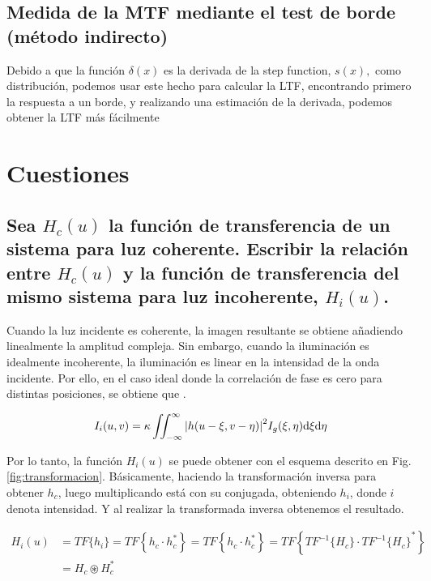 \documentclass{./packages/optica-article}
\newcommand\conv{\circledast}
\begin{document}
\subsection{Medida de la MTF mediante el test de borde (método indirecto)}

Debido a que la función $\delta(x)$ es la derivada de la step function, $s(x),$ como distribución, podemos usar este hecho para calcular la LTF, encontrando primero la respuesta a un borde, y realizando una estimación de la derivada, podemos obtener la LTF más fácilmente

\section{Cuestiones}

\subsection{Sea $H_{c}(u)$ la función de transferencia de un sistema para luz coherente. Escribir la relación entre $H_{c}(u)$ y la función de transferencia del mismo sistema para luz incoherente, $H_{i}(u)$.}

Cuando la luz incidente es coherente, la imagen resultante se obtiene añadiendo linealmente la amplitud compleja. Sin embargo, cuando la iluminación es idealmente incoherente, la iluminación es linear en la intensidad de la onda incidente. Por ello, en el caso ideal donde la correlación de fase es cero para distintas posiciones, se obtiene que \cite[p.~132--134]{goodman1996introduction}.

\begin{equation}
	I_{i}(u,v) = \kappa \iint_{-\infty}^{\infty}\abs{h(u - \xi, v- \eta)}^{2} I_{g}(\xi, \eta) \dd \xi \dd \eta
\end{equation}

Por lo tanto, la función $H_{i}(u)$ se puede obtener con el esquema descrito en Fig. \ref{fig:transformacion}. Básicamente, haciendo la transformación inversa para obtener $h_{c}$, luego multiplicando está con su conjugada, obteniendo $h_{i}$, donde $i$ denota intensidad. Y al realizar la transformada inversa obtenemos el resultado.

\begin{align}
	H_{i}(u)
	 & = TF\{h_i\}
	= TF\left\{ h_{c} \cdot h^{*}_{c}\right\}
	= TF\left\{ h_{c} \cdot h^{*}_{c}\right\}
	= TF\left\{ TF^{-1}\{H_{c}\} \cdot {TF^{-1}\{H_{c}\}}^{*}\right\}
	\\
	 & = H_{c} \conv H^{*}_{c}
\end{align}
\end{document}
